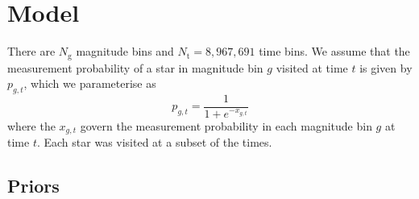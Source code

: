 \documentclass[fleqn,usenatbib]{mnras}
\begin{document}
\section{Model}
There are $N_\text{g}$ magnitude bins and $N_\text{t}=8,967,691$ time bins.
We assume that the measurement probability of a star in magnitude bin $g$ visited at time $t$ is given by $p_{g,t}$, which we parameterise as
\begin{equation}
    p_{g,t} = \frac{1}{1+e^{-x_{g,t}}}
\end{equation}
where the $x_{g,t}$ govern the measurement probability in each magnitude bin $g$ at time $t$. Each star was visited at a subset of the times.

\subsection{Priors}
\end{document}
